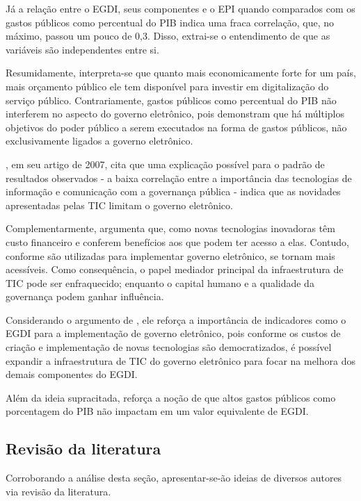 Já a relação entre o EGDI, seus componentes e o EPI quando comparados com os gastos públicos como percentual do PIB indica uma fraca correlação, que, no máximo, passou um pouco de 0,3. Disso, extrai-se o entendimento de que as variáveis são independentes entre si.

Resumidamente, interpreta-se que quanto mais economicamente forte for um país, mais orçamento público ele tem disponível para investir em digitalização do serviço público. Contrariamente, gastos públicos como percentual do PIB não interferem no aspecto do governo eletrônico, pois demonstram que há múltiplos objetivos do poder público a serem executados na forma de gastos públicos, não exclusivamente ligados a governo eletrônico.

\cite{singh2007country}, em seu artigo de 2007, cita que uma explicação possível para o padrão de resultados observados - a baixa correlação entre a importância das tecnologias de informação e comunicação com a governança pública - indica que as novidades apresentadas pelas TIC limitam o governo eletrônico.

Complementarmente, \cite{singh2007country} argumenta que, como novas tecnologias inovadoras têm custo financeiro e conferem benefícios aos que podem ter acesso a elas. Contudo, conforme são utilizadas para implementar governo eletrônico, se tornam mais acessíveis. Como consequência, o papel mediador principal da infraestrutura de TIC pode ser enfraquecido; enquanto o capital humano e a qualidade da governança podem ganhar influência.

 Considerando o argumento de \cite{singh2007country}, ele reforça a importância de indicadores como o EGDI para a implementação de governo eletrônico, pois conforme os custos de criação e implementação de novas tecnologias são democratizados, é possível expandir a infraestrutura de TIC do governo eletrônico para focar na melhora dos demais componentes do EGDI.

Além da ideia supracitada, \cite{singh2007country} reforça a noção de que altos gastos públicos como porcentagem do PIB não impactam em um valor equivalente de EGDI.

\subsection{Revisão da literatura}

Corroborando a análise desta seção, apresentar-se-ão ideias de diversos autores via revisão da literatura.

